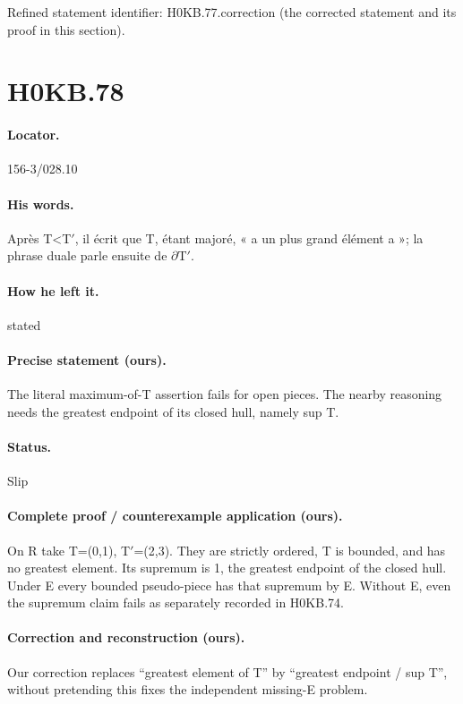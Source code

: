 \noindent Refined statement identifier: H0KB.77.correction (the corrected statement and its proof in this section).

\section*{H0KB.78}\label{statement:H0KB.78}
\paragraph{Locator.} 156-3/028.10

\paragraph{His words.} Après T<T\ensuremath{\prime}, il écrit que T, étant majoré, « a un plus grand élément a »; la phrase duale parle ensuite de \ensuremath{\partial}T\ensuremath{\prime}.

\paragraph{How he left it.} stated

\paragraph{Precise statement (ours).} The literal maximum-of-T assertion fails for open pieces. The nearby reasoning needs the greatest endpoint of its closed hull, namely sup T.

\paragraph{Status.} Slip

\paragraph{Complete proof / counterexample application (ours).} On R take T=(0,1), T\ensuremath{\prime}=(2,3). They are strictly ordered, T is bounded, and has no greatest element. Its supremum is 1, the greatest endpoint of the closed hull. Under E every bounded pseudo-piece has that supremum by E. Without E, even the supremum claim fails as separately recorded in H0KB.74.

\paragraph{Correction and reconstruction (ours).} Our correction replaces “greatest element of T” by “greatest endpoint / sup T”, without pretending this fixes the independent missing-E problem.

